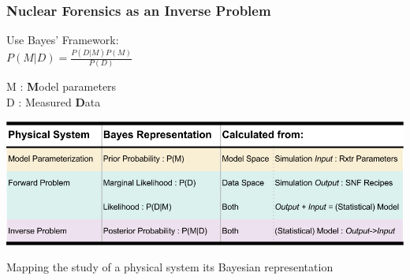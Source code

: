\begin{frame}
  \frametitle{Nuclear Forensics as an Inverse Problem}
  \begin{minipage}[t]{0.5\textwidth}
  Use Bayes' Framework:\\
  $ P(M|D) = \frac{P(D|M)P(M)}{P(D)} $
  \end{minipage}%
  \begin{minipage}[t]{0.5\textwidth}
    M : \textbf{M}odel parameters\\
    D : Measured \textbf{D}ata
  \end{minipage}
  \vfill
  \vfill
  \begin{table}
    \centering
    \includegraphics[width=\textwidth]{./figures/InverseIntro.png}
    \caption{Mapping the study of a physical system its Bayesian representation}
  \end{table}
\end{frame}

